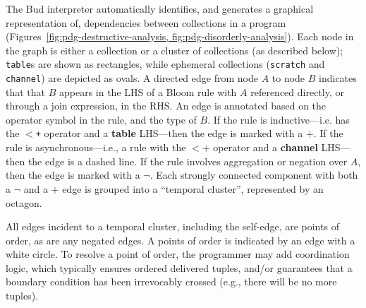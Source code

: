 The Bud interpreter automatically identifies, and generates a graphical
representation of, dependencies between collections in a program
(Figures~\ref{fig:pdg-destructive-analysis, fig:pdg-disorderly-analysis}).
Each node in the graph is either a collection or a cluster of collections (as
described below); \texttt{table}s are shown as rectangles, while ephemeral
collections (\texttt{scratch} and \texttt{channel}) are depicted as ovals.  A
directed edge from node $A$ to node $B$ indicates that that $B$ appears in the
LHS of a Bloom rule with $A$ referenced directly, or through a join expression,
in the RHS.  An edge is annotated based on the operator symbol in the rule, and
the type of $B$.  If the rule is inductive---i.e. has the \texttt{$<$+}
operator and a {\bf table} LHS---then the edge is marked with a $+$.  If the
rule is asynchronous---i.e., a rule with the \texttt{$<+$} operator and a {\bf
channel} LHS---then the edge is a dashed line.  If the rule involves
aggregation or negation over $A$, then the edge is marked with a $\lnot$.
Each strongly connected component with both a $\lnot$ and a $+$ edge is grouped
into a ``temporal cluster'', represented by an octagon.

All edges incident to a temporal cluster, including the self-edge, are points
of order, as are any negated edges.
A points of order is indicated by an edge with a white circle.
To resolve a point of order, the programmer may add coordination logic, which typically ensures  ordered delivered tuples, and/or guarantees that a boundary condition has been irrevocably crossed (e.g., there will be no more tuples).

